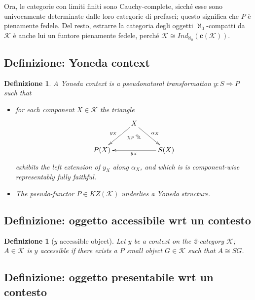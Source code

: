 \documentclass[11pt]{article}
\def\To{\Rightarrow}
\newcommand{\Searrow}{\rotatebox[origin=c]{-45}{$\Rightarrow$}} %
\theoremstyle{reference}
\newtheorem{definition}[theorem]{Definizione}
\begin{document}
Ora, le categorie con limiti finiti sono Cauchy-complete,
sicché esse sono univocamente determinate dalle loro
categorie di prefasci; questo significa che \(P\) è pienamente
fedele. Del resto, estrarre la categoria degli oggetti
\(\aleph_{\text{0}}\)-compatti da \(\mathcal K\) è anche lui un funtore
pienamente fedele, perché \(\mathcal K \cong
Ind_\aleph_0(\mathbf{c}(\mathcal K))\).

\subsection{Definizione: Yoneda context}
\label{sec:org59733a9}

\begin{definition}
	A \emph{Yoneda context} is a pseudonatural transformation $y : S \To P$ such that
	\begin{itemize}
		\item for each component $X\in\mathcal K$ the triangle
		\[
			\vcenter{\xymatrix{
			& X \ar[dr]^{\alpha_X}\ar[dl]_{y_X}\ar@{}[d]|{\chi_{P}\Searrow}& \\
			P(X) && \ar[ll]^{y_X} S (X)
			}}
		\]
		exhibits the left extension of $y_X$ along $\alpha_X$, and which is is component-wise representably fully faithful.
		\item The pseudo\hyp{}functor $P\in KZ(\mathcal K)$ underlies a Yoneda structure.
	\end{itemize}
\end{definition}


\subsection{Definizione: oggetto accessibile wrt un contesto}
\label{sec:orgf6e5502}

\begin{definition}[$y$ accessible object]\label{yonacc}
	Let $y$ be a context on the 2-category $\mathcal K$; $A\in\mathcal K$ is $y$ \emph{accessible} if there exists a $ P $ small object $G\in \mathcal K$ such that $A\cong S  G$.
\end{definition}


\subsection{Definizione: oggetto presentabile wrt un contesto}
\label{sec:org1861897}
\end{document}

